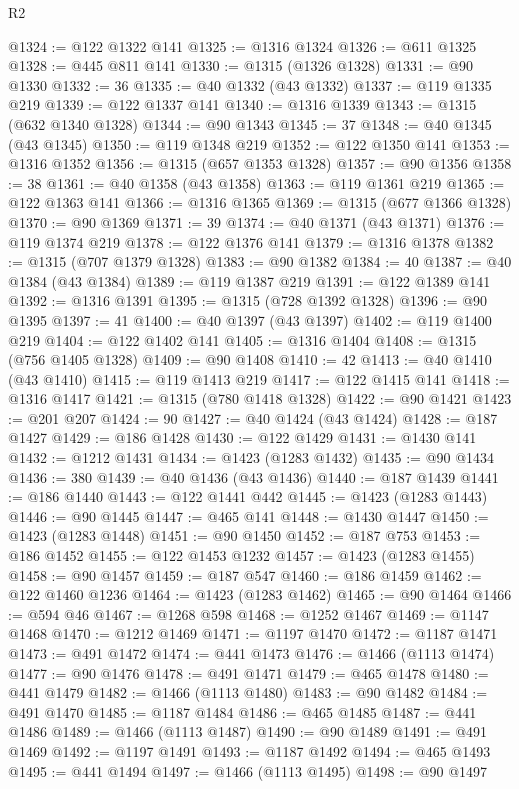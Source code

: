 \begin{lexlean}{R2}
\begin{coremodule}
{{{{{{{{{{{{{{{{{{{{{{{{{{{{{{{{{{{{{{{{{{{{{{{{{{{{{{{{{{{{{{{{{{{{{{{{{{{{{{{{{{{{{{{{{{{{@1324 := @122 @1322 @141
@1325 := @1316 @1324
@1326 := @611 @1325
@1328 := @445 @811 @141
@1330 := @1315 (@1326 @1328)
@1331 := @90 @1330
@1332 := 36
@1335 := @40 @1332 (@43 @1332)
@1337 := @119 @1335 @219
@1339 := @122 @1337 @141
@1340 := @1316 @1339
@1343 := @1315 (@632 @1340 @1328)
@1344 := @90 @1343
@1345 := 37
@1348 := @40 @1345 (@43 @1345)
@1350 := @119 @1348 @219
@1352 := @122 @1350 @141
@1353 := @1316 @1352
@1356 := @1315 (@657 @1353 @1328)
@1357 := @90 @1356
@1358 := 38
@1361 := @40 @1358 (@43 @1358)
@1363 := @119 @1361 @219
@1365 := @122 @1363 @141
@1366 := @1316 @1365
@1369 := @1315 (@677 @1366 @1328)
@1370 := @90 @1369
@1371 := 39
@1374 := @40 @1371 (@43 @1371)
@1376 := @119 @1374 @219
@1378 := @122 @1376 @141
@1379 := @1316 @1378
@1382 := @1315 (@707 @1379 @1328)
@1383 := @90 @1382
@1384 := 40
@1387 := @40 @1384 (@43 @1384)
@1389 := @119 @1387 @219
@1391 := @122 @1389 @141
@1392 := @1316 @1391
@1395 := @1315 (@728 @1392 @1328)
@1396 := @90 @1395
@1397 := 41
@1400 := @40 @1397 (@43 @1397)
@1402 := @119 @1400 @219
@1404 := @122 @1402 @141
@1405 := @1316 @1404
@1408 := @1315 (@756 @1405 @1328)
@1409 := @90 @1408
@1410 := 42
@1413 := @40 @1410 (@43 @1410)
@1415 := @119 @1413 @219
@1417 := @122 @1415 @141
@1418 := @1316 @1417
@1421 := @1315 (@780 @1418 @1328)
@1422 := @90 @1421
@1423 := @201 @207
@1424 := 90
@1427 := @40 @1424 (@43 @1424)
@1428 := @187 @1427
@1429 := @186 @1428
@1430 := @122 @1429
@1431 := @1430 @141
@1432 := @1212 @1431
@1434 := @1423 (@1283 @1432)
@1435 := @90 @1434
@1436 := 380
@1439 := @40 @1436 (@43 @1436)
@1440 := @187 @1439
@1441 := @186 @1440
@1443 := @122 @1441 @442
@1445 := @1423 (@1283 @1443)
@1446 := @90 @1445
@1447 := @465 @141
@1448 := @1430 @1447
@1450 := @1423 (@1283 @1448)
@1451 := @90 @1450
@1452 := @187 @753
@1453 := @186 @1452
@1455 := @122 @1453 @1232
@1457 := @1423 (@1283 @1455)
@1458 := @90 @1457
@1459 := @187 @547
@1460 := @186 @1459
@1462 := @122 @1460 @1236
@1464 := @1423 (@1283 @1462)
@1465 := @90 @1464
@1466 := @594 @46
@1467 := @1268 @598
@1468 := @1252 @1467
@1469 := @1147 @1468
@1470 := @1212 @1469
@1471 := @1197 @1470
@1472 := @1187 @1471
@1473 := @491 @1472
@1474 := @441 @1473
@1476 := @1466 (@1113 @1474)
@1477 := @90 @1476
@1478 := @491 @1471
@1479 := @465 @1478
@1480 := @441 @1479
@1482 := @1466 (@1113 @1480)
@1483 := @90 @1482
@1484 := @491 @1470
@1485 := @1187 @1484
@1486 := @465 @1485
@1487 := @441 @1486
@1489 := @1466 (@1113 @1487)
@1490 := @90 @1489
@1491 := @491 @1469
@1492 := @1197 @1491
@1493 := @1187 @1492
@1494 := @465 @1493
@1495 := @441 @1494
@1497 := @1466 (@1113 @1495)
@1498 := @90 @1497
}}}}}}}}}}}}}}}}}}}}}}}}}}}}}}}}}}}}}}}}}}}}}}}}}}}}}}}}}}}}}}}}}}}}}}}}}}}}}}}}}}}}}}}}}}}}
\end{coremodule}
\end{lexlean}
